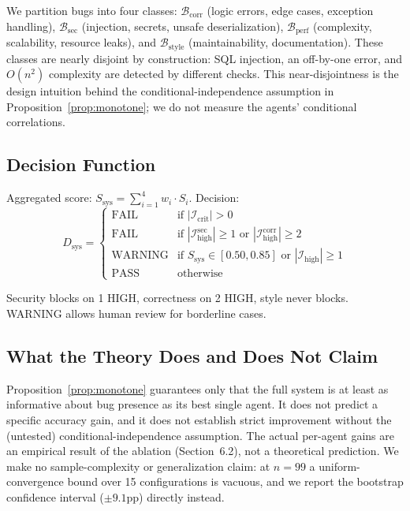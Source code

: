\documentclass[10pt,twocolumn]{article}
\begin{document}
We partition bugs into four classes: $\mathcal{B}_{\text{corr}}$ (logic errors, edge cases, exception handling), $\mathcal{B}_{\text{sec}}$ (injection, secrets, unsafe deserialization), $\mathcal{B}_{\text{perf}}$ (complexity, scalability, resource leaks), and $\mathcal{B}_{\text{style}}$ (maintainability, documentation). These classes are nearly disjoint by construction: SQL injection, an off-by-one error, and $O(n^2)$ complexity are detected by different checks. This near-disjointness is the design intuition behind the conditional-independence assumption in Proposition~\ref{prop:monotone}; we do not measure the agents' conditional correlations.

\subsection{Decision Function}

Aggregated score: $S_{\text{sys}} = \sum_{i=1}^4 w_i \cdot S_i$. Decision:
\begin{equation}
    D_{\text{sys}} = \begin{cases}
        \text{FAIL} & \text{if } |\mathcal{I}_{\text{crit}}| > 0 \\
        \text{FAIL} & \text{if } |\mathcal{I}_{\text{high}}^{\text{sec}}| \geq 1 \text{ or } |\mathcal{I}_{\text{high}}^{\text{corr}}| \geq 2 \\
        \text{WARNING} & \text{if } S_{\text{sys}} \in [0.50, 0.85] \text{ or } |\mathcal{I}_{\text{high}}| \geq 1 \\
        \text{PASS} & \text{otherwise}
    \end{cases}
\end{equation}

Security blocks on 1 HIGH, correctness on 2 HIGH, style never blocks. WARNING allows human review for borderline cases.

\subsection{What the Theory Does and Does Not Claim}

Proposition~\ref{prop:monotone} guarantees only that the full system is at least as informative about bug presence as its best single agent. It does not predict a specific accuracy gain, and it does not establish strict improvement without the (untested) conditional-independence assumption. The actual per-agent gains are an empirical result of the ablation (Section~6.2), not a theoretical prediction. We make no sample-complexity or generalization claim: at $n=99$ a uniform-convergence bound over 15 configurations is vacuous, and we report the bootstrap confidence interval ($\pm 9.1$pp) directly instead.
\end{document}
